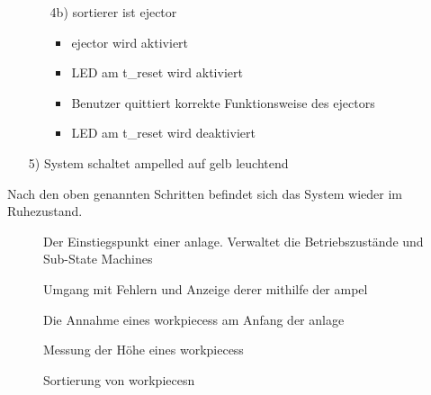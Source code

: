 \begin{enumerate}
\begin{enumerate}
        \item[4b)] \gls{sortierer} ist \gls{ejector}
        \begin{itemize}
            \item \Gls{ejector} wird aktiviert
            \item LED am \gls{t_reset} wird aktiviert
            \item Benutzer quittiert korrekte Funktionsweise des \gls{ejector}s
            \item LED am \gls{t_reset} wird deaktiviert
        \end{itemize}
    \end{enumerate}
    \item[5)] System schaltet \gls{ampelled} auf gelb leuchtend
\end{enumerate}
Nach den oben genannten Schritten befindet sich das System wieder im Ruhezustand.


\begin{figure}
    \caption{Der Einstiegspunkt einer \gls{anlage}.
    Verwaltet die Betriebszustände und Sub-State Machines}
    \label{fig:stm_top_level}
\end{figure}

\begin{figure}
    \caption{Umgang mit Fehlern und Anzeige derer mithilfe der \gls{ampel}}
    \label{fig:stm_error}
\end{figure}

\begin{figure}
    \caption{Die Annahme eines \glspl{workpiece}s am Anfang der \gls{anlage}}
    \label{fig:stm_werkstueck_annahme}
\end{figure}

\begin{figure}
    \caption{Messung der Höhe eines \glspl{workpiece}s}
    \label{fig:stm_hoehe_messen}
\end{figure}

\begin{figure}
    \caption{Sortierung von \glspl{workpiece}n}
    \label{fig:stm_werkstueck_sortieren}
\end{figure}

